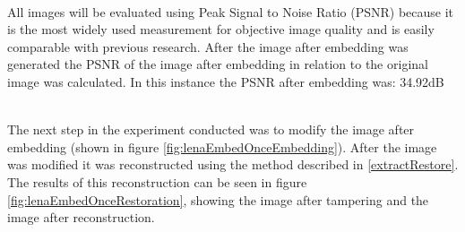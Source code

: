 \documentclass[12pt]{article}
\begin{document}
\hspace{0pt} \\
All images will be evaluated using Peak Signal to Noise Ratio (PSNR) because it is the most widely used measurement for objective image quality and is easily comparable with previous research. \cite{wang2002image}
After the image after embedding was generated the PSNR of the image after embedding in relation to the original image was calculated.
In this instance the PSNR after embedding was: 34.92dB 

\hspace{0pt} \\
The next step in the experiment conducted was to modify the image after embedding (shown in figure \ref{fig:lenaEmbedOnceEmbedding}).
After the image was modified it was reconstructed using the method described in \ref{extractRestore}.
The results of this reconstruction can be seen in figure \ref{fig:lenaEmbedOnceRestoration}, showing the image after tampering and the image after reconstruction.
\end{document}
